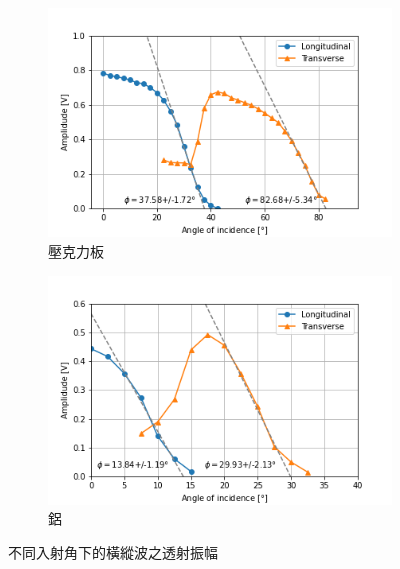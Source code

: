 \documentclass[12pt]{report}
\begin{document}
\begin{figure}[htbp]
    \centering
    \begin{subfigure}{0.49\textwidth}
        \centering
        \includegraphics[width=\textwidth]{Acrylic.png}
        \caption{壓克力板}
        \label{fig:acrylic}
    \end{subfigure}
    \hfill
    \begin{subfigure}{0.49\textwidth}
        \centering
        \includegraphics[width=\textwidth]{Aluminium.png}
        \caption{鋁}
        \label{fig:aluminium}
    \end{subfigure}
    \caption{不同入射角下的橫縱波之透射振幅}
    \label{fig:07result}
\end{figure}
\end{document}
